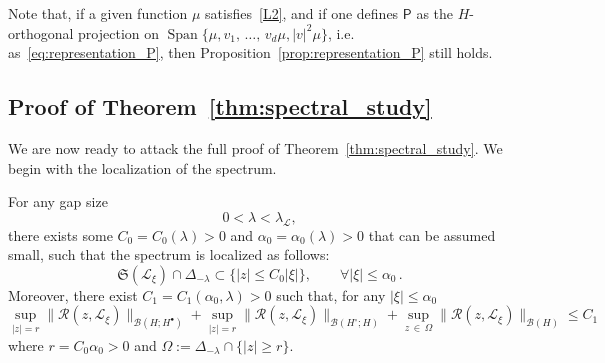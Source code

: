 \documentclass[AHL,Unicode,longabstracts,published]{cedram}
\DeclareMathOperator{\Span}{Span}
\newcommand{\fkS}{\mathfrak{S}}
\newcommand{\LL}{\mathcal{L}}
\newcommand{\PP}{\mathsf{P}}
\newcommand{\RR}{\mathcal{R}}
\newcommand{\BBB}{\mathscr{B}}
\newcommand{\Ss}{H}
\newcommand{\Ssp}{H^{\bullet}}
\newcommand{\Ssm}{H^{\circ}}
\renewcommand*\le{\leqslant}
\renewcommand*\ge{\geqslant}
\renewcommand*\leq{\leqslant}
\let\oldforall\forall
\renewcommand*{\forall}{\mathrel{\oldforall}}
\begin{document}
\begin{rema}
Note that, if a given function $\mu$ satisfies~\eqref{L2}, and if one defines $\PP$ as the $\Ss$-orthogonal projection on $\Span \{\mu, v_1,\,\dots,\,v_d \mu, |v|^2 \mu\}$, i.e. as~\eqref{eq:representation_P}, then Proposition~\ref{prop:representation_P} still holds.
\end{rema}

\subsection{Proof of Theorem~\ref{thm:spectral_study}}

We are now ready to attack the full proof of Theorem~\ref{thm:spectral_study}. We begin with the localization of the spectrum.


\begin{lemm}\label{lem:localization_spectrum}
For any gap size
\[
0 < \lambda < \lambda_\LL,
\]
there exists some $C_0=C_0(\lambda) > 0$ and $\alpha_{0} = \alpha_{0}(\lambda) > 0$ that can be assumed small, such that the spectrum is localized as follows:
\[
\fkS(\LL_{\xi}) \cap \Delta_{-\lambda} \subset \big\{ | z | \le C_0 | \xi | \big\}, \qquad \forall | \xi | \le \alpha_{0}\,.
\]
Moreover, there exist $C_1=C_1(\alpha_{0}, \lambda) > 0$ such that, for any $|\xi| \leq \alpha_{0}$
\begin{equation}\label{eq:bound_L_xi}
\sup_{ | z | = r } \| \RR(z,\LL_{\xi}) \|_{\BBB(\Ss;\Ssp) } + \sup_{|z| = r} \| \RR(z, \LL_\xi) \|_{ \BBB(\Ssm ; \Ss) } + \sup_{z\,\in\,\Omega} \| \RR(z,\LL_{\xi}) \|_{\BBB(\Ss)} \le C_1
\end{equation}
where $r=C_{0}\alpha_{0} >0$ and $\Omega := \Delta_{-\lambda} \cap \{ | z | \ge r \}$.
\end{lemm}
\end{document}
